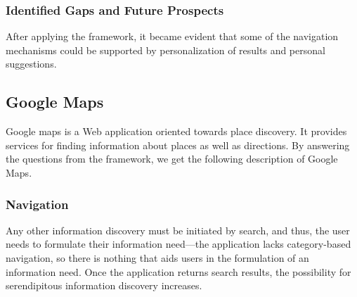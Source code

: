 {{{\subsubsection{Identified Gaps and Future Prospects}
After applying the framework, it became evident that some of the navigation mechanisms could be supported by personalization of results and personal suggestions.
}%
} %


{\subsection{Google Maps}
Google maps is a Web application oriented towards place discovery. It provides services for finding information about places as well as directions.  By answering the questions from the framework, we get the following description of Google Maps.

{\subsubsection{Navigation}
  Any other information discovery must be initiated by search, and thus, the user needs to formulate their information need---the application lacks category-based navigation, so there is nothing that aids users in the formulation of an information need. Once the application returns search results, the possibility for serendipitous information discovery increases.  

}}}
